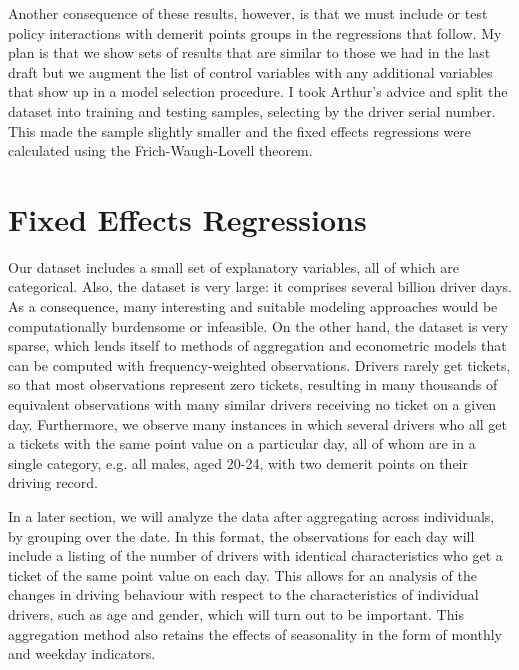 \documentclass[12pt]{paper}
\begin{document}
Another consequence of these results, however, is that we must include or test policy interactions with demerit points groups in the regressions that follow. 
My plan is that we show sets of results that are similar to those we had in the last draft 
but we augment the list of control variables with any additional variables that show up in a model selection procedure.
I took Arthur's advice and split the dataset into training and testing samples, selecting by the driver serial number.  
This made the sample slightly smaller and the fixed effects regressions were calculated using the Frich-Waugh-Lovell theorem. 


\section*{Fixed Effects Regressions}

Our dataset includes a small set of explanatory variables, all of which are categorical. 
Also, the dataset is very large: it comprises several billion driver days. 
As a consequence, many interesting and suitable modeling approaches would be computationally burdensome or infeasible. 
On the other hand, the dataset is very sparse, which lends itself to methods of aggregation and
econometric models that can be computed with frequency-weighted observations.
Drivers rarely get tickets, so that most observations represent zero tickets, 
resulting in many thousands of equivalent observations with many similar drivers 
receiving no ticket on a given day. 
Furthermore, we observe many instances in which several drivers
who all get a tickets with the same point value on a particular day, 
all of whom are in a single category, 
e.g. all males, aged 20-24, with two demerit points on their driving record. 

In a later section, we will analyze the data after aggregating across individuals, by grouping over the date. 
In this format, the observations for each day will include a listing of the number of drivers with identical characteristics who get a ticket of the same point value on each day. 
This allows for an analysis of the changes in driving behaviour with respect to 
the characteristics of individual drivers, such as age and gender, which will turn out to be important. 
This aggregation method also retains the effects of seasonality in the form of monthly and weekday indicators. 
\end{document}
